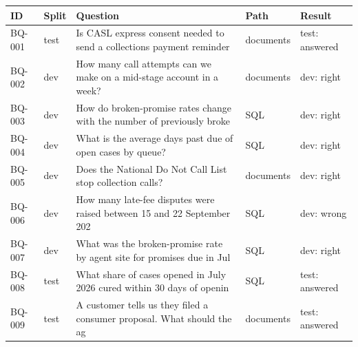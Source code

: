 \documentclass[
  10pt,
]{article}
\renewcommand{\_}{\oldunderscore\allowbreak}
\begin{document}
\begin{longtable}[]{@{}
  >{\raggedright\arraybackslash}p{}
  >{\raggedright\arraybackslash}p{}
  >{\raggedright\arraybackslash}p{}
  >{\raggedright\arraybackslash}p{}
  >{\raggedright\arraybackslash}p{}@{}}
\toprule\noalign{}
\begin{minipage}[b]{\linewidth}\raggedright
ID
\end{minipage} & \begin{minipage}[b]{\linewidth}\raggedright
Split
\end{minipage} & \begin{minipage}[b]{\linewidth}\raggedright
Question
\end{minipage} & \begin{minipage}[b]{\linewidth}\raggedright
Path
\end{minipage} & \begin{minipage}[b]{\linewidth}\raggedright
Result
\end{minipage} \\
\midrule\noalign{}
\endhead
\bottomrule\noalign{}
\endlastfoot
BQ-001 & test & Is CASL express consent needed to send a collections
payment reminder & documents & test: answered \\
BQ-002 & dev & How many call attempts can we make on a mid-stage account
in a week? & documents & dev: right \\
BQ-003 & dev & How do broken-promise rates change with the number of
previously broke & SQL & dev: right \\
BQ-004 & dev & What is the average days past due of open cases by queue?
& SQL & dev: right \\
BQ-005 & dev & Does the National Do Not Call List stop collection calls?
& documents & dev: right \\
BQ-006 & dev & How many late-fee disputes were raised between 15 and 22
September 202 & SQL & dev: wrong \\
BQ-007 & dev & What was the broken-promise rate by agent site for
promises due in Jul & SQL & dev: right \\
BQ-008 & test & What share of cases opened in July 2026 cured within 30
days of openin & SQL & test: answered \\
BQ-009 & test & A customer tells us they filed a consumer proposal. What
should the ag & documents & test: answered \\

\end{longtable}
\end{document}
